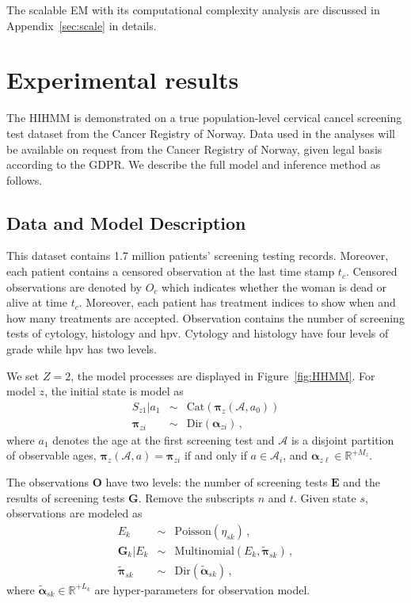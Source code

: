\documentclass{article}
\begin{document}
The scalable EM with its computational complexity analysis are discussed in Appendix~\ref{sec:scale} in details.


\section{Experimental results}
The HIHMM is demonstrated on a true population-level cervical cancel screening test dataset from the Cancer Registry of Norway. Data used in the analyses will be available on request from the Cancer Registry of Norway, given legal basis according to the GDPR. We describe the full model and inference method as follows. 

\subsection{Data and Model Description}\label{sec:data}
This dataset contains 1.7 million patients' screening testing records. Moreover, each patient contains a censored observation at the last time stamp $t_{c}$. Censored observations are denoted by $O_{c}$ which indicates whether the woman is dead or alive at time $t_c$. Moreover, each patient has treatment indices to show when and how many treatments are accepted. Observation contains the number of screening tests of cytology, histology and hpv. Cytology and histology have four levels of grade while hpv has two levels.

We set $Z = 2$, the model processes are displayed in Figure~\ref{fig:HHMM}. For model $z$, the initial state  is model as  
\begin{eqnarray*}
	S_{z1}|a_{1} & \sim & \mathrm{Cat}(\bm \pi_z(\mathcal{A}, a_0)) \\
	\bm \pi_{zi} & \sim & \mathrm{Dir}(\bm \alpha_{zi})\,,
\end{eqnarray*}
where $a_1$ denotes the age at the first screening test and $\mathcal{A}$ is a disjoint partition of observable ages, $\bm \pi_z(\mathcal{A}, a) = \bm \pi_{zi}$ if and only if $a \in \mathcal{A}_{i}$, and $\bm{\alpha}_{z\ell} \in \mathbb{R}^{+M_z}$.

The observations $\bm O$ have two levels: the number of screening tests $\bm E$ and the results of screening tests $\bm G$. Remove the subscripts $n$ and $t$. Given state $s$, observations are modeled as  
\begin{eqnarray*}
	E_k & \sim & \mathrm{Poisson}(\eta_{sk})\,, \nonumber \\
	{\bm G}_k|E_k & \sim & \mathrm{Multinomial}(E_k, \tilde{\bm\pi}_{sk})\,, \nonumber \\
	\tilde{\bm\pi}_{sk} & \sim & \mathrm{Dir}(\tilde{\bm\alpha}_{sk}) \,,
\end{eqnarray*}
where 
$\tilde{\bm \alpha}_{sk} \in \mathbb{R}^{+L_k}$ are hyper-parameters for observation model.
\end{document}
